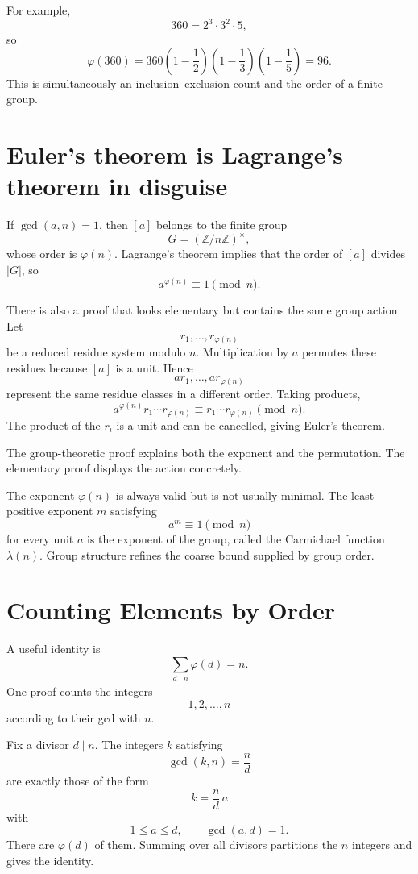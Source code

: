 For example,
\[
  360=2^3\cdot3^2\cdot5,
\]
so
\[
  \varphi(360)
  =360\left(1-\frac12\right)
       \left(1-\frac13\right)
       \left(1-\frac15\right)
  =96.
\]
This is simultaneously an inclusion--exclusion count and the order of a finite group.

\section{Euler's theorem is Lagrange's theorem in disguise}

If \(\gcd(a,n)=1\), then \([a]\) belongs to the finite group
\[
  G=(\mathbb Z/n\mathbb Z)^\times,
\]
whose order is \(\varphi(n)\).  Lagrange's theorem implies that the order of \([a]\) divides \(|G|\), so
\[
  \boxed{
  a^{\varphi(n)}\equiv1\pmod n.}
\]

There is also a proof that looks elementary but contains the same group action.  Let
\[
  r_1,\ldots,r_{\varphi(n)}
\]
be a reduced residue system modulo \(n\).  Multiplication by \(a\) permutes these residues because \([a]\) is a unit.  Hence
\[
  ar_1,\ldots,ar_{\varphi(n)}
\]
represent the same residue classes in a different order.  Taking products,
\[
  a^{\varphi(n)}r_1\cdots r_{\varphi(n)}
  \equiv
  r_1\cdots r_{\varphi(n)}\pmod n.
\]
The product of the \(r_i\) is a unit and can be cancelled, giving Euler's theorem.

The group-theoretic proof explains both the exponent and the permutation.  The elementary proof displays the action concretely.

The exponent \(\varphi(n)\) is always valid but is not usually minimal.  The least positive exponent \(m\) satisfying
\[
  a^m\equiv1\pmod n
\]
for every unit \(a\) is the exponent of the group, called the Carmichael function \(\lambda(n)\).  Group structure refines the coarse bound supplied by group order.

\section{Counting Elements by Order}

A useful identity is
\[
  \boxed{
  \sum_{d\mid n}\varphi(d)=n.}
\]
One proof counts the integers
\[
  1,2,\ldots,n
\]
according to their gcd with \(n\).

Fix a divisor \(d\mid n\).  The integers \(k\) satisfying
\[
  \gcd(k,n)=\frac nd
\]
are exactly those of the form
\[
  k=\frac nd\,a
\]
with
\[
  1\le a\le d,
  \qquad
  \gcd(a,d)=1.
\]
There are \(\varphi(d)\) of them.  Summing over all divisors partitions the \(n\) integers and gives the identity.

